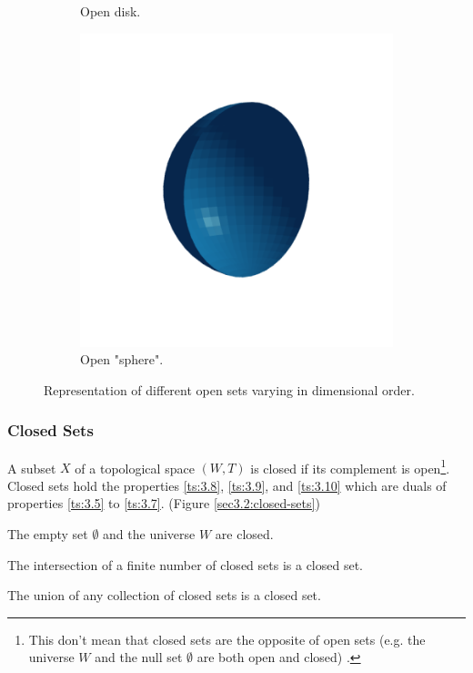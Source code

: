 \documentclass[a4paper,11pt,oneside]{article}
\begin{document}
\begin{figure}[ht]
\begin{subfigure}[b]{0.2\textwidth}
		\caption{Open disk.}
	\end{subfigure}
	\hfill
	\begin{subfigure}[b]{0.2\textwidth}
		\centering
		\includegraphics[width=\textwidth]{section3/3.2/open-sphere.png}
		\caption{Open "sphere".}
	\end{subfigure}
	\hfill
	\caption{Representation of different open sets varying in dimensional order.}
	\label{sec3.2:open-sets}
\end{figure}

   
    
\subsubsection{Closed Sets}
\begin{definition}
	A subset $X$ of a topological space $(W, T)$ is closed if its complement is open\footnote{This don't mean that closed sets are the opposite of open sets (e.g. the universe $W$ and the null set $\emptyset$ are both open and closed) \cite{mansfield_1987}.}. Closed sets hold the properties \eqref{ts:3.8}, \eqref{ts:3.9}, and \eqref{ts:3.10} which are duals of properties \eqref{ts:3.5} to \eqref{ts:3.7}. (Figure \ref{sec3.2:closed-sets})
				    
	\begin{property}
		\label{ts:3.8}
		The empty set $\emptyset$ and the universe $W$ are closed. \cite{mansfield_1987}
	\end{property}
	\begin{property}
		\label{ts:3.9}
		The intersection of a finite number of closed sets is a closed set. \cite{mansfield_1987}
	\end{property}
	\begin{property}
		\label{ts:3.10}
		The union of any collection of closed sets is a closed set. \cite{mansfield_1987}
	\end{property}
\end{definition}
    
\end{document}
